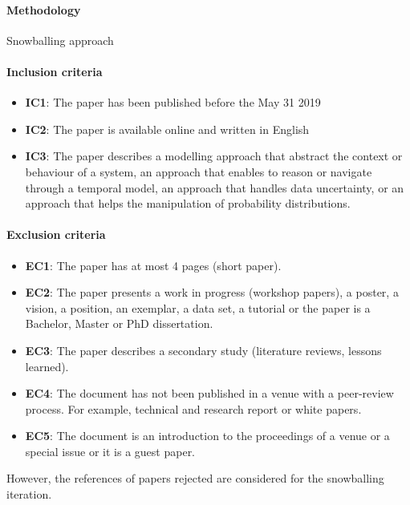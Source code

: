\paragraph{Methodology}
Snowballing approach~\cite{DBLP:conf/ease/Wohlin14}

\paragraph{Inclusion criteria}
\begin{itemize}
	\item \textbf{IC1}: The paper has been published before the May 31 2019
	\item \textbf{IC2}: The paper is available online and written in English
	\item \textbf{IC3}: The paper describes a modelling approach that abstract the context or behaviour of a system, an approach that enables to reason or navigate through a temporal model, an approach that handles data uncertainty, or an approach that helps the manipulation of probability distributions.
\end{itemize}

\paragraph{Exclusion criteria}
\begin{itemize}
	\item \textbf{EC1}: The paper has at most 4 pages (short paper).
	\item \textbf{EC2}: The paper presents a work in progress (workshop papers), a poster, a vision, a position, an exemplar, a data set, a tutorial or the paper is a Bachelor, Master or PhD dissertation.
	\item \textbf{EC3}: The paper describes a secondary study (\eg literature reviews, lessons learned).
	\item \textbf{EC4}: The document has not been published in a venue with a peer-review process. For example, technical and research report or white papers.
	\item \textbf{EC5}: The document is an introduction to the proceedings of a venue or a special issue or it is a guest paper.
\end{itemize}

However, the references of papers rejected are considered for the snowballing iteration.